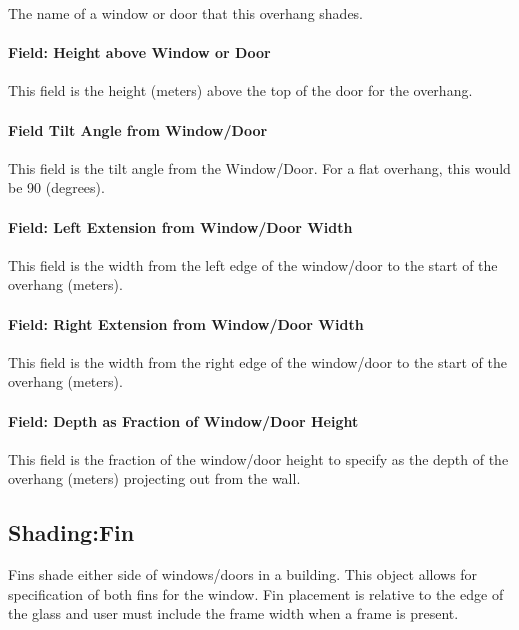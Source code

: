 The name of a window or door that this overhang shades.

\paragraph{Field: Height above Window or Door}\label{field-height-above-window-or-door-1}

This field is the height (meters) above the top of the door for the overhang.

\paragraph{Field Tilt Angle from Window/Door}\label{field-tilt-angle-from-windowdoor-1}

This field is the tilt angle from the Window/Door. For a flat overhang, this would be 90 (degrees).

\paragraph{Field: Left Extension from Window/Door Width}\label{field-left-extension-from-windowdoor-width-1}

This field is the width from the left edge of the window/door to the start of the overhang (meters).

\paragraph{Field: Right Extension from Window/Door Width}\label{field-right-extension-from-windowdoor-width-1}

This field is the width from the right edge of the window/door to the start of the overhang (meters).

\paragraph{Field: Depth as Fraction of Window/Door Height}\label{field-depth-as-fraction-of-windowdoor-height}

This field is the fraction of the window/door height to specify as the depth of the overhang (meters) projecting out from the wall.

\subsection{Shading:Fin}\label{shadingfin}

Fins shade either side of windows/doors in a building. This object allows for specification of both fins for the window. Fin placement is relative to the edge of the glass and user must include the frame width when a frame is present.

